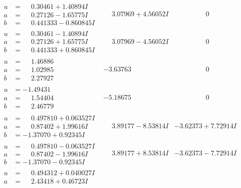 \documentclass[1p]{elsarticle_modified}
\theoremstyle{definition}
\begin{document}
$$\begin{array}{c|c|c}
\begin{aligned}
u &= \phantom{-}0.30461 + 1.40894 I \\
a &= \phantom{-}0.27126 - 1.65775 I \\
b &= \phantom{-}0.441333 - 0.860845 I\end{aligned}
 & \phantom{-}3.07969 + 4.56052 I & \phantom{-0.000000 } 0 \\ \hline\begin{aligned}
u &= \phantom{-}0.30461 - 1.40894 I \\
a &= \phantom{-}0.27126 + 1.65775 I \\
b &= \phantom{-}0.441333 + 0.860845 I\end{aligned}
 & \phantom{-}3.07969 - 4.56052 I & \phantom{-0.000000 } 0 \\ \hline\begin{aligned}
u &= \phantom{-}1.46886\phantom{ +0.000000I} \\
a &= \phantom{-}1.02985\phantom{ +0.000000I} \\
b &= \phantom{-}2.27927\phantom{ +0.000000I}\end{aligned}
 & -3.63763\phantom{ +0.000000I} & \phantom{-0.000000 } 0 \\ \hline\begin{aligned}
u &= -1.49431\phantom{ +0.000000I} \\
a &= \phantom{-}1.54404\phantom{ +0.000000I} \\
b &= \phantom{-}2.46779\phantom{ +0.000000I}\end{aligned}
 & -5.18675\phantom{ +0.000000I} & \phantom{-0.000000 } 0 \\ \hline\begin{aligned}
u &= \phantom{-}0.497810 + 0.063527 I \\
a &= \phantom{-}0.87402 + 1.99616 I \\
b &= -1.37070 + 0.92345 I\end{aligned}
 & \phantom{-}3.89177 - 8.53814 I & -3.62373 + 7.72914 I \\ \hline\begin{aligned}
u &= \phantom{-}0.497810 - 0.063527 I \\
a &= \phantom{-}0.87402 - 1.99616 I \\
b &= -1.37070 - 0.92345 I\end{aligned}
 & \phantom{-}3.89177 + 8.53814 I & -3.62373 - 7.72914 I \\ \hline\begin{aligned}
u &= \phantom{-}0.494312 + 0.040027 I \\
a &= \phantom{-}2.43418 + 0.46723 I \\

\end{aligned}
\end{array}$$
\end{document}
